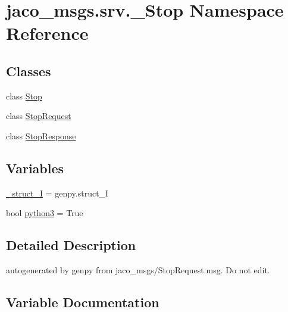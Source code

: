 \hypertarget{namespacejaco__msgs_1_1srv_1_1__Stop}{}\section{jaco\+\_\+msgs.\+srv.\+\_\+\+Stop Namespace Reference}
\label{namespacejaco__msgs_1_1srv_1_1__Stop}
\subsection*{Classes}
\begin{DoxyCompactItemize}
\item 
class \hyperlink{classjaco__msgs_1_1srv_1_1__Stop_1_1Stop}{Stop}
\item 
class \hyperlink{classjaco__msgs_1_1srv_1_1__Stop_1_1StopRequest}{Stop\+Request}
\item 
class \hyperlink{classjaco__msgs_1_1srv_1_1__Stop_1_1StopResponse}{Stop\+Response}
\end{DoxyCompactItemize}
\subsection*{Variables}
\begin{DoxyCompactItemize}
\item 
\hyperlink{namespacejaco__msgs_1_1srv_1_1__Stop_a6e8b78e1cd091743530f9ac204f1d821}{\+\_\+struct\+\_\+I} = genpy.\+struct\+\_\+I
\item 
bool \hyperlink{namespacejaco__msgs_1_1srv_1_1__Stop_a899b3592a9ba8cfbac52f077b0786d4f}{python3} = True
\end{DoxyCompactItemize}


\subsection{Detailed Description}
\begin{DoxyVerb}autogenerated by genpy from jaco_msgs/StopRequest.msg. Do not edit.\end{DoxyVerb}
 

\subsection{Variable Documentation}
